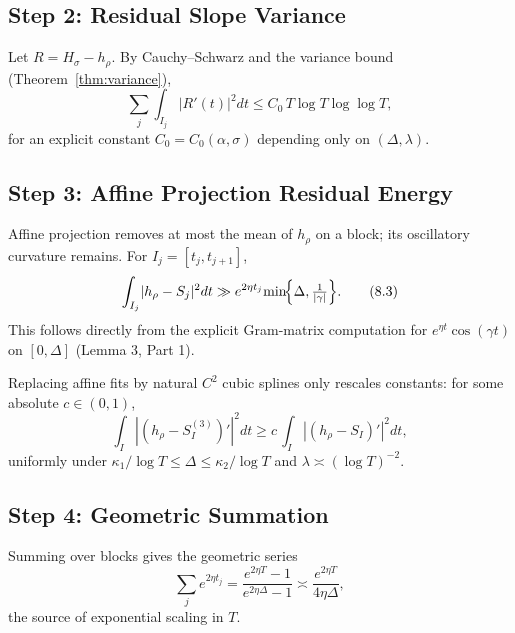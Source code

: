 \subsection{Step 2: Residual Slope Variance}\label{step:residual-variance}

Let $R=H_\sigma-h_\rho$.  By Cauchy–Schwarz and the variance bound
(Theorem~\ref{thm:variance}),
\begin{equation}
\sum_j\!\int_{I_j}\!|R'(t)|^2dt
   \le C_0\,T\log T\log\log T,
\tag{8.2}\label{eq:residual-variance}
\end{equation}
for an explicit constant $C_0=C_0(\alpha,\sigma)$ depending only on $(\Delta,\lambda)$.

\subsection{Step 3: Affine Projection Residual Energy}\label{step:affine-energy}

Affine projection removes at most the mean of $h_\rho$ on a block; its oscillatory curvature remains.
For $I_j=[t_j,t_{j+1}]$,
\begin{equation}
\int_{I_j}\!|h_\rho-S_j|^2dt
   \gg e^{2\eta t_j}\!\min\!\Bigl\{\Delta,\tfrac{1}{|\gamma|}\Bigr\}.
\tag{8.3}\label{eq:affine-energy}
\end{equation}
This follows directly from the explicit Gram-matrix computation for
$e^{\eta t}\cos(\gamma t)$ on $[0,\Delta]$ (Lemma 3, Part 1).

\begin{remark}\label{rmk:spline}
Replacing affine fits by natural $C^2$ cubic splines only rescales constants:
for some absolute $c\in(0,1)$,
\[
\int_I |(h_\rho-S_I^{(3)})'|^2 dt
   \ge c\,\int_I |(h_\rho-S_I)'|^2 dt,
\]
uniformly under $\kappa_1/\log T\le\Delta\le\kappa_2/\log T$
and $\lambda\asymp(\log T)^{-2}$.
\end{remark}

\subsection{Step 4: Geometric Summation}\label{step:geom-sum}

Summing over blocks gives the geometric series
\begin{equation}
\sum_j e^{2\eta t_j}
   = \frac{e^{2\eta T}-1}{e^{2\eta\Delta}-1}
   \asymp \frac{e^{2\eta T}}{4\eta\Delta},
\tag{8.4}\label{eq:geom-sum}
\end{equation}
the source of exponential scaling in $T$.

